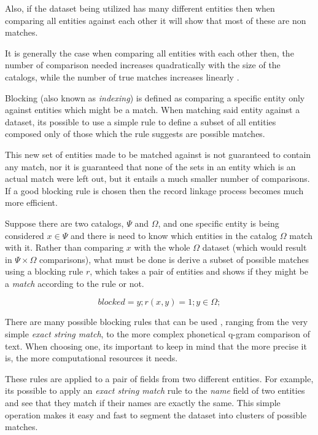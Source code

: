 \documentclass[epsfig,a4paper,11pt,titlepage,twoside,openany]{book}
\begin{document}
Also, if the dataset being utilized has many different
entities then when comparing all entities against each other it will show that most of these are non matches.


It is generally the case when comparing all entities with each other then,
the number of comparison needed increases quadratically with the size of the
catalogs, while the number of true matches increases linearly
\cite{christen12_data}.

Blocking (also known as \textit{indexing}) is defined as comparing a specific entity only against entities which might be a match. When matching said entity against a dataset, its possible to use a simple rule to define a subset of all entities
composed only of those which the rule suggests are possible matches. 

This new set of entities made to be matched against is not guaranteed to contain any match, nor it
is guaranteed that none of the sets in an entity which is an actual match were left out, but it entails a much smaller number of comparisons. 
If a good blocking rule is chosen then the record linkage process becomes much more efficient.

Suppose there are two catalogs, $\Psi$ and $\Omega$, and one specific entity is being considered $x \in
\Psi$ and there is need to know which entities in the catalog $\Omega$ match with it.
Rather than comparing $x$ with the whole $\Omega$ dataset (which would result in
$\Psi \times \Omega$ comparisons), what must be done is derive a subset of possible matches using a
blocking rule $r$, which takes a pair of entities and shows if they might be a \textit{match} according to the rule or not.

$$
blocked = {y; r(x,y) = 1; y \in \Omega;}
$$

There are many possible blocking rules that can be used
\cite{christen12_survey_index_techn_scalab_recor_linkag_dedup}, ranging from the
very simple \textit{exact string match}, to the more complex phonetical q-gram
comparison of text. When choosing one, its important to keep in mind that the more
precise it is, the more computational resources it needs.

These rules are applied to a pair of fields from two different entities. For
example, its possible to apply an \textit{exact string match} rule to the \textit{name}
field of two entities and see that they match if their names are exactly the
same. This simple operation makes it easy and fast to segment the dataset into
clusters of possible matches.
\end{document}

